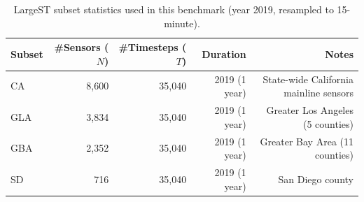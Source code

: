 \documentclass[10pt]{article}
\begin{document}
\begin{table}[t]
\centering
\caption{LargeST subset statistics used in this benchmark (year 2019, resampled to 15-minute).}
\label{tab:datasets}
\begin{tabular}{lrrrr}
\toprule
Subset & \#Sensors ($N$) & \#Timesteps ($T$) & Duration & Notes \\
\midrule
CA  & 8{,}600 & 35{,}040 & 2019 (1 year) & State-wide California mainline sensors \\
GLA & 3{,}834 & 35{,}040 & 2019 (1 year) & Greater Los Angeles (5 counties) \\
GBA & 2{,}352 & 35{,}040 & 2019 (1 year) & Greater Bay Area (11 counties) \\
SD  & 716     & 35{,}040 & 2019 (1 year) & San Diego county \\
\bottomrule
\end{tabular}
\end{table}






\end{document}
